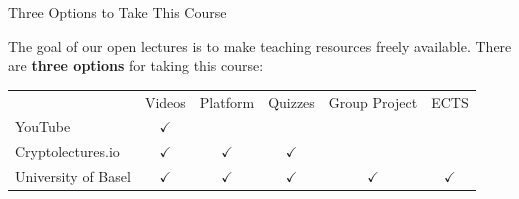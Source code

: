 \documentclass[handout]{beamer}
\begin{document}
\begin{frame}{Three Options to Take This Course}

The goal of our open lectures is to make teaching resources freely available. There are \color{focus} \textbf{three options} \color{black} for taking this course:\vspace{1em}

\begin{table}\footnotesize
	\begin{tabular}{lccccc}
	\hline \hline
									& Videos 		& Platform 		& Quizzes  		& Group Project	& ECTS 			\\ \cline{2-6}
		YouTube 	 				& $\checkmark$	& 				& 				& 				&				\\
		Cryptolectures.io 			& $\checkmark$	& $\checkmark$	& $\checkmark$	&				&				\\
		University of Basel			& $\checkmark$	& $\checkmark$	& $\checkmark$	& $\checkmark$	&$\checkmark$	\\
		\hline \hline
	\end{tabular}
\end{table} \vspace{2em}


\end{frame}
\end{document}
